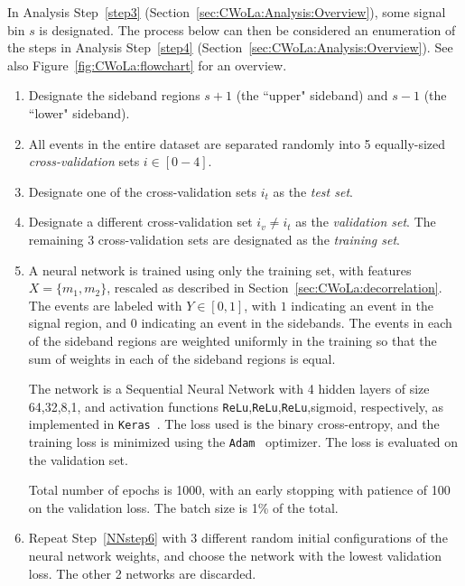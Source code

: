 In Analysis Step~\ref{step3} (Section~\ref{sec:CWoLa:Analysis:Overview}), some signal bin $s$ is designated. The process below can then be considered an enumeration of the steps in Analysis Step~\ref{step4} (Section~\ref{sec:CWoLa:Analysis:Overview}).
See also Figure~\ref{fig:CWoLa:flowchart} for an overview. 

\begin{enumerate}
  \item Designate the sideband regions $s+1$ (the ``upper" sideband) and $s-1$ (the ``lower" sideband). 
  \label{NNstep2}
  \item All events in the entire dataset are separated randomly into 5 equally-sized \textit{cross-validation} sets $i \in [0-4]$.
  \label{NNstep1}
  \item Designate one of the cross-validation sets $i_t$ as the \textit{test set}.
  \label{NNstep3}
  \item Designate a different cross-validation set $i_v \ne i_t$ as the \textit{validation set}. The remaining 3 cross-validation sets are designated as the \textit{training set}.
  \label{NNstep5}
  \item A neural network is trained using only the training set, with features $X = \{m_1,m_2\}$, rescaled as described in Section~\ref{sec:CWoLa:decorrelation}. The events are labeled with $Y \in [0,1]$, with $1$ indicating an event in the signal region, and $0$ indicating an event in the sidebands. The events in each of the sideband regions are weighted uniformly in the training so that the sum of weights in each of the sideband regions is equal.

  The network is a Sequential Neural Network with 4 hidden layers of size 64,32,8,1, and activation functions \texttt{ReLu},\texttt{ReLu},\texttt{ReLu},sigmoid, respectively, as implemented in \texttt{Keras}~\cite{chollet2015keras}.
  The loss used is the binary cross-entropy, and the training loss is minimized using the \texttt{Adam}~\cite{kingma2014adam} optimizer.
  The loss is evaluated on the validation set.
  
  Total number of epochs is 1000, with an early stopping with patience of 100 on the validation loss. The batch size is 1\% of the total.

  
  \label{NNstep6}
  \item Repeat Step~\ref{NNstep6} with 3 different random initial configurations of the neural network weights, and choose the network with the lowest validation loss. The other 2 networks are discarded.
  \label{NNstep7}


\end{enumerate}

